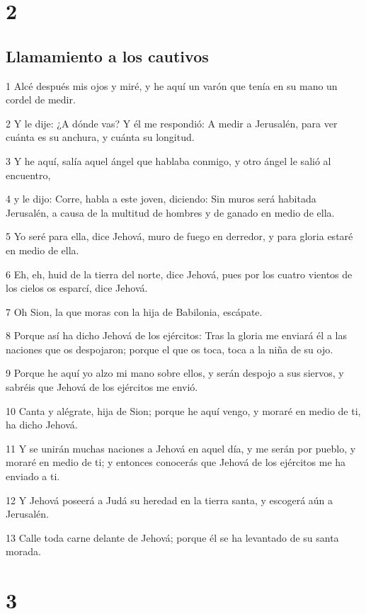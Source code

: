 \chapter{2}

\section*{Llamamiento a los cautivos}

\par 1 Alcé después mis ojos y miré, y he aquí un varón que tenía en su mano un cordel de medir.
\par 2 Y le dije: ¿A dónde vas? Y él me respondió: A medir a Jerusalén, para ver cuánta es su anchura, y cuánta su longitud.
\par 3 Y he aquí, salía aquel ángel que hablaba conmigo, y otro ángel le salió al encuentro,
\par 4 y le dijo: Corre, habla a este joven, diciendo: Sin muros será habitada Jerusalén, a causa de la multitud de hombres y de ganado en medio de ella.
\par 5 Yo seré para ella, dice Jehová, muro de fuego en derredor, y para gloria estaré en medio de ella.
\par 6 Eh, eh, huid de la tierra del norte, dice Jehová, pues por los cuatro vientos de los cielos os esparcí, dice Jehová.
\par 7 Oh Sion, la que moras con la hija de Babilonia, escápate.
\par 8 Porque así ha dicho Jehová de los ejércitos: Tras la gloria me enviará él a las naciones que os despojaron; porque el que os toca, toca a la niña de su ojo.
\par 9 Porque he aquí yo alzo mi mano sobre ellos, y serán despojo a sus siervos, y sabréis que Jehová de los ejércitos me envió.
\par 10 Canta y alégrate, hija de Sion; porque he aquí vengo, y moraré en medio de ti, ha dicho Jehová.
\par 11 Y se unirán muchas naciones a Jehová en aquel día, y me serán por pueblo, y moraré en medio de ti; y entonces conocerás que Jehová de los ejércitos me ha enviado a ti.
\par 12 Y Jehová poseerá a Judá su heredad en la tierra santa, y escogerá aún a Jerusalén.
\par 13 Calle toda carne delante de Jehová; porque él se ha levantado de su santa morada.

\chapter{3}

